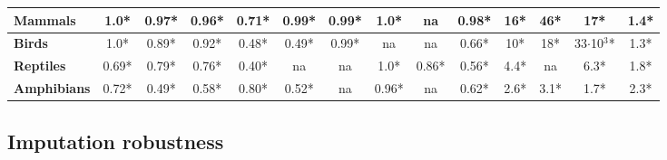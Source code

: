 \documentclass[11pt]{article}
\begin{document}
\begin{table}[h!]
\begin{center}
\begin{tabular}{|l|c|c|c|c|c|c|c|c|c|c|c|c|c|}
\textbf{Mammals}                                      & 1.0*           & 0.97*        & 0.96*          & 0.71*         & 0.99*         & 0.99*         & 1.0*          & na            & 0.98*         & 16*                   & 46*                   & 17*                        & 1.4*                 \\ \hline
\textbf{Birds}                                        & 1.0*           & 0.89*        & 0.92*          & 0.48*         & 0.49*         & 0.99*         & na            & na            & 0.66*         & 10*                   & 18*                   & 33$\cdot$10$^3$*           & 1.3*                 \\ \hline
\textbf{Reptiles}                                     & 0.69*          & 0.79*        & 0.76*          & 0.40*         & na            & na            & 1.0*          & 0.86*         & 0.56*         & 4.4*                  & na                    & 6.3*                       & 1.8*                 \\ \hline
\textbf{Amphibians}                                   & 0.72*          & 0.49*        & 0.58*          & 0.80*         & 0.52*         & na            & 0.96*         & na            & 0.62*         & 2.6*                  & 3.1*                  & 1.7*                       & 2.3*                 \\ \hline
\end{tabular}
\end{center}
\end{table}

\pagebreak
\begin{center}
\end{center}



\pagebreak
\subsection{Imputation robustness}
\end{document}
